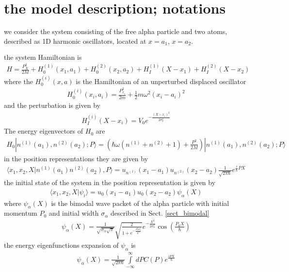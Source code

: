 \section{the model description; notations}
\label{sec:the-model-description-notations-two-atoms}
we consider the system consisting of the free alpha particle and two atoms, described as 1D harmonic oscillators, located at $x=a_1$, $x=a_2$.

the system Hamiltonian is
\begin{align}
  H=\frac{P_X^2}{2M}+H^{(1)}_0(x_1, a_1)+H^{(2)}_0(x_2, a_2)+H_I^{(1)}(X-x_1)+H_I^{(2)}(X-x_2)
\end{align}
where the $H^{(i)}_0(x,a)$ is the Hamiltonian of an unperturbed displaced oscillator
\begin{align}
  H^{(i)}_0(x_i,a_i)=\frac{P_{x_i}^2}{2m}+\frac{1}{2}m\omega^2(x_i-a_i)^2
\end{align}
and the perturbation is given by
\begin{align}
  H_I^{(i)}(X-x_i)=V_0e^{-\frac{(X-x_i)^2}{2\sigma_V^2}}
\end{align}
The energy eigenvectors of $H_0$ are
\begin{align}
  H_0|n^{(1)}(a_1),n^{(2)}(a_2);P\rangle = (\hbar\omega(n^{(1)}+n^{(2)}+1)+\frac{P^2}{2M})|n^{(1)}(a_1),n^{(2)}(a_2);P\rangle
\end{align}
in the position representations they are given by
\begin{align}
  \langle x_1,x_2,X|n^{(1)}(a_1)n^{(2)}(a_2),P\rangle = u_{n^{(1)}}(x_1-a_1)u_{n^{(2)}}(x_2-a_2)\frac{1}{\sqrt{2\pi\hbar}}e^{\frac{i}{\hbar}PX}
\end{align}
the initial state of the system in the position representation is given by
\begin{align}
  \langle x_1,x_2,X|\psi_i\rangle = u_0(x_1-a_1)u_0(x_2-a_2) \psi_\alpha(X)
\end{align}
where $\psi_\alpha(X)$ is the bimodal  wave packet of the alpha particle with initial momentum $P_0$ and initial width $\sigma_\alpha$ described in Sect. \ref{sect_bimodal}
\begin{align}
  \psi_\alpha(X) = \frac{1}{\sqrt{\sigma_\alpha\sqrt{\pi}}}\sqrt{\frac{2}{1+e^{-\frac{P_0^2\sigma_\alpha^2}{\hbar^2}}}}e^{-\frac{X^2}{2\sigma_\alpha^2}}\cos\left(\frac{P_0 X}{\hbar}\right)\label{psi(X_0)-tdse_tdpt-two}
\end{align}
the energy eigenfunctions expansion of $\psi_\alpha$ is
\begin{align}
  \psi_\alpha(X)=\frac1{\sqrt{2\pi\hbar}}\int\limits_{-\infty}^{\infty}dP C(P)e^{\frac{iPX}{\hbar}}
\end{align}
